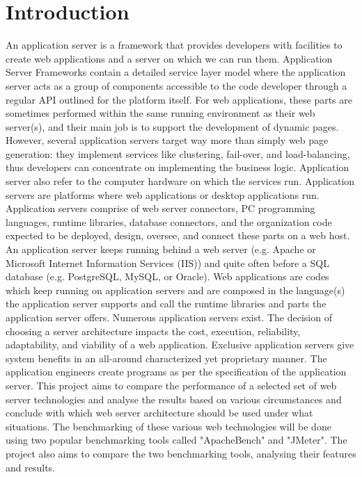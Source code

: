 \documentclass[../thesis.tex]{subfiles}
\begin{document}
\chapter{Introduction}

\vspace{5mm}
An application server is a framework that provides developers with facilities to create web applications and a server on which we can run them. Application Server Frameworks contain a detailed service layer model where the application server acts as a group of components accessible to the code developer through a regular API outlined for the platform itself. For web applications, these parts are sometimes performed within the same running environment as their web server(s), and their main job is to support the development of dynamic pages. However, several application servers target way more than simply web page generation: they implement services like clustering, fail-over, and load-balancing, thus developers can concentrate on implementing the business logic.
Application server also refer to the computer hardware on which the services run.
\vspace{5mm}
Application servers are platforms where web applications or desktop applications run. Application servers comprise of web server connectors, PC programming languages, runtime libraries, database connectors, and the organization code expected to be deployed, design, oversee, and connect these parts on a web host. An application server keeps running behind a web server (e.g. Apache or Microsoft Internet Information Services (IIS)) and quite often before a SQL database (e.g. PostgreSQL, MySQL, or Oracle). Web applications are codes which keep running on application servers and are composed in the language(s) the application server supports and call the runtime libraries and parts the application server offers.
\vspace{5mm}
Numerous application servers exist. The decision of choosing a server architecture impacts the cost, execution, reliability, adaptability, and viability of a web application. Exclusive application servers give system benefits in an all-around characterized yet proprietary manner. The application engineers create programs as per the specification of the application server. This project aims to compare the performance of a selected set of web server technologies and analyse the results based on various circumstances and conclude with which web server architecture should be used under what situations. The benchmarking of these various web technologies will be done using two popular benchmarking tools called "ApacheBench" and "JMeter". The project also aims to compare the two benchmarking tools, analysing their features and results.
\end{document}
